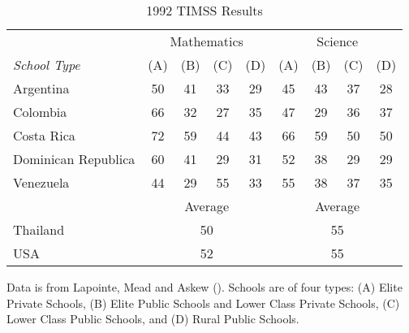 \begin{table}
\centering
\label{tab:first}
  \begin{threeparttable}
    \caption{1992 TIMSS Results}
\begin{tabular}{lcccccccc}
\toprule
                    & \multicolumn{4}{c}{Mathematics} & \multicolumn{4}{c}{Science} \\
\textit{School Type}         & (A)      & (B)      & (C)     & (D)     & (A)     & (B)     & (C)    & (D)    \\
\midrule

Argentina           & 50     & 41     & 33    & 29    & 45    & 43    & 37   & 28   \\
Colombia            & 66     & 32     & 27    & 35    & 47    & 29    & 36   & 37   \\
Costa Rica          & 72     & 59     & 44    & 43    & 66    & 59    & 50   & 50   \\
Dominican Republica & 60     & 41     & 29    & 31    & 52    & 38    & 29   & 29   \\
Venezuela           & 44     & 29     & 55    & 33    & 55    & 38    & 37   & 35   \\
\hline
                    & \multicolumn{4}{c}{Average}     & \multicolumn{4}{c}{Average} \\

Thailand            & \multicolumn{4}{c}{50}          & \multicolumn{4}{c}{55}      \\
USA                 & \multicolumn{4}{c}{52}          & \multicolumn{4}{c}{55} \\
\bottomrule
\end{tabular}
    \begin{tablenotes}
      \small
      \item Data is from Lapointe, Mead and Askew (\citeyear{lapointe_learning_1992}). Schools are of four types: (A) Elite Private Schools, (B) Elite Public Schools and Lower Class Private Schools, (C) Lower Class Public Schools, and (D) Rural Public Schools.
    \end{tablenotes}
  \end{threeparttable}
\end{table}

